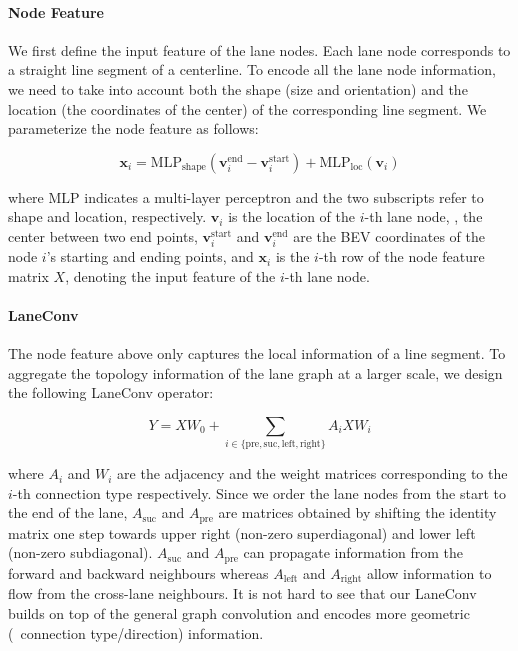 \paragraph{Node Feature}
\label{par:7_improving_efficiency_node_feature}

We first define the input feature of the lane nodes. Each lane node corresponds to a straight line segment of a centerline. To encode  all the lane node information, we need to take into account both the shape (size and orientation) and the location (the coordinates of the center) of the corresponding line segment. We parameterize the node feature as follows:

\begin{equation}
	\mathbf{x}_i = \text{MLP}_\text{shape} \left( \mathbf{v}_i^{\text{end}} - \mathbf{v}_i^{\text{start}} \right)
	+ \text{MLP}_{\text{loc}}\left(\textbf{v}_i\right)
	\label{eqn:node_feat}
\end{equation}

where $\text{MLP}$ indicates a multi-layer perceptron and the two subscripts refer to shape and location, respectively.  $\textbf{v}_i$ is the location of the $i$-th lane node, \ie, the center between two end points, $\mathbf{v}_i^{\text{start}}$ and $\mathbf{v}_i^{\text{end}}$ are the BEV coordinates of the node $i$'s starting and ending points, and $\mathbf{x}_i$ is the $i$-th row of the node feature matrix $X$, denoting the input feature of the $i$-th lane node.

\paragraph{LaneConv}
\label{par:7_improving_efficiency_lane_conv}

The node feature above only captures the local information of a line segment.
To aggregate the topology information of the lane graph at a larger scale,
we design the following LaneConv operator:

\begin{equation}
	Y = X W_0 + \sum_{i \in \{ \text{pre}, \text{suc}, \text{left}, \text{right} \}} {A_{i} X W_{i}}
	\label{eqn:laneconv}
\end{equation}

where $A_{i}$ and $W_i$ are the adjacency  and the weight matrices corresponding to the $i$-th connection type respectively. Since we order the lane nodes from the start to the end of the lane, $A_{\text{suc}}$ and $A_{\text{pre}}$ are matrices obtained by shifting the identity matrix one step towards upper right (non-zero superdiagonal) and lower left (non-zero subdiagonal). $A_{\text{suc}}$ and $A_{\text{pre}}$ can propagate information from the forward and backward neighbours whereas $A_{\text{left}}$ and $A_{\text{right}}$ allow information to flow from the cross-lane neighbours. It is not hard to see that our LaneConv builds on top of the general graph convolution and encodes more geometric (\eg \ connection type/direction) information.

